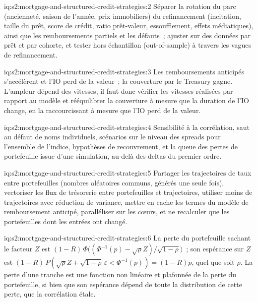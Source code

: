 \begin{solution}{iq:s2:mortgage-and-structured-credit-strategies:2}
Séparer la rotation du parc (ancienneté, saison de l'année, prix immobiliers) du refinancement (incitation, taille du prêt, score de crédit, ratio prêt-valeur, essoufflement, effets
médiatiques), ainsi que les remboursements partiels et les défauts~; ajuster sur des données par prêt et par cohorte, et tester hors échantillon (out-of-sample) à travers les vagues de refinancement.
\end{solution}

\begin{solution}{iq:s2:mortgage-and-structured-credit-strategies:3}
Les remboursements anticipés s'accélèrent et l'IO perd de la valeur~; la couverture par le Treasury gagne. L'ampleur dépend des vitesses, il faut donc vérifier les vitesses réalisées par rapport au modèle et
rééquilibrer la couverture à mesure que la duration de l'IO change, en la raccourcissant à mesure que l'IO perd de la valeur.
\end{solution}

\begin{solution}{iq:s2:mortgage-and-structured-credit-strategies:4}
Sensibilité à la corrélation, saut au défaut de noms individuels, scénarios sur le niveau des spreads pour l'ensemble de l'indice, hypothèses de recouvrement, et la queue des pertes de portefeuille
issue d'une simulation, au-delà des deltas du premier ordre.
\end{solution}

\begin{solution}{iq:s2:mortgage-and-structured-credit-strategies:5}
Partager les trajectoires de taux entre portefeuilles (nombres aléatoires communs, générés une seule fois), vectoriser les flux de trésorerie entre portefeuilles et trajectoires, utiliser moins de trajectoires avec
réduction de variance, mettre en cache les termes du modèle de remboursement anticipé, paralléliser sur les cœurs, et ne recalculer que les portefeuilles dont les entrées ont changé.
\end{solution}

\begin{solution}{iq:s2:mortgage-and-structured-credit-strategies:6}
La perte du portefeuille sachant le facteur $Z$ est $(1-R)\,\Phi\bigl((\Phi^{-1}(p) - \sqrt\rho Z)/\sqrt{1-\rho}\bigr)$~; son espérance sur $Z$ est
$(1-R)\,P(\sqrt\rho Z + \sqrt{1-\rho}\,\varepsilon < \Phi^{-1}(p)) = (1-R)p$, quel que soit $\rho$. La perte d'une tranche est une fonction non linéaire et plafonnée de la
perte du portefeuille, si bien que son espérance dépend de toute la distribution de cette perte, que la corrélation étale.
\end{solution}
